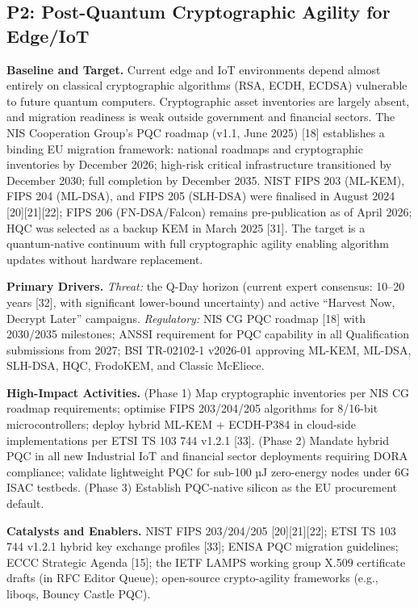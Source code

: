 \documentclass{ieeeaccess}
\begin{document}
\subsection{P2: Post-Quantum Cryptographic Agility for
Edge/IoT}\label{p2-post-quantum-cryptographic-agility-for-edgeiot}

\textbf{Baseline and Target.} Current edge and IoT environments depend
almost entirely on classical cryptographic algorithms (RSA, ECDH, ECDSA)
vulnerable to future quantum computers. Cryptographic asset inventories
are largely absent, and migration readiness is weak outside government
and financial sectors. The NIS Cooperation Group's PQC roadmap (v1.1,
June 2025) {[}18{]} establishes a binding EU migration framework:
national roadmaps and cryptographic inventories by December 2026;
high-risk critical infrastructure transitioned by December 2030; full
completion by December 2035. NIST FIPS 203 (ML-KEM), FIPS 204 (ML-DSA),
and FIPS 205 (SLH-DSA) were finalised in August 2024
{[}20{]}{[}21{]}{[}22{]}; FIPS 206 (FN-DSA/Falcon) remains
pre-publication as of April 2026; HQC was selected as a backup KEM in
March 2025 {[}31{]}. The target is a quantum-native continuum with full
cryptographic agility enabling algorithm updates without hardware
replacement.

\textbf{Primary Drivers.} \emph{Threat:} the Q-Day horizon (current
expert consensus: 10--20 years {[}32{]}, with significant lower-bound
uncertainty) and active ``Harvest Now, Decrypt Later'' campaigns.
\emph{Regulatory:} NIS CG PQC roadmap {[}18{]} with 2030/2035
milestones; ANSSI requirement for PQC capability in all Qualification
submissions from 2027; BSI TR-02102-1 v2026-01 approving ML-KEM, ML-DSA,
SLH-DSA, HQC, FrodoKEM, and Classic McEliece.

\textbf{High-Impact Activities.} (Phase 1) Map cryptographic inventories
per NIS CG roadmap requirements; optimise FIPS 203/204/205 algorithms
for 8/16-bit microcontrollers; deploy hybrid ML-KEM + ECDH-P384 in
cloud-side implementations per ETSI TS 103 744 v1.2.1 {[}33{]}. (Phase
2) Mandate hybrid PQC in all new Industrial IoT and financial sector
deployments requiring DORA compliance; validate lightweight PQC for
sub-100 µJ zero-energy nodes under 6G ISAC testbeds. (Phase 3) Establish
PQC-native silicon as the EU procurement default.

\textbf{Catalysts and Enablers.} NIST FIPS 203/204/205
{[}20{]}{[}21{]}{[}22{]}; ETSI TS 103 744 v1.2.1 hybrid key exchange
profiles {[}33{]}; ENISA PQC migration guidelines; ECCC Strategic Agenda
{[}15{]}; the IETF LAMPS working group X.509 certificate drafts (in RFC
Editor Queue); open-source crypto-agility frameworks (e.g., liboqs,
Bouncy Castle PQC).
\end{document}
